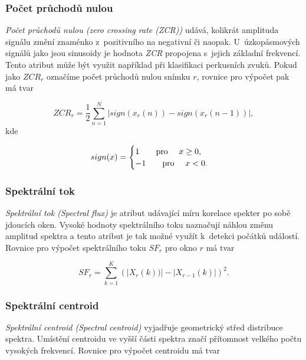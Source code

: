 \subsubsection*{Počet průchodů nulou}
\textit{Počet průchodů nulou (zero crossing rate (ZCR))} udává, kolikrát amplituda signálu změní znaménko z~pozitivního na negativní či naopak. U~úzkopásmových signálů jako jsou sinusoidy je hodnota \textit{ZCR} propojena s~jejich základní frekvencí. Tento atribut může být využit například při klasifikaci perkusních zvuků. Pokud jako $ZCR_r$ označíme počet průchodů nulou snímku $r$, rovnice pro výpočet pak má tvar

\begin{equation}
	ZCR_r = \frac{1}{2} \sum\limits_{n=1}^{N} | sign(x_r(n)) - sign(x_r(n-1)) |,
\end{equation}
kde

\begin{equation}
    sign(x)=
    \begin{cases}
        1 \text{\qquad pro \quad} x \geq 0,\\
        -1 \text{\qquad pro \quad} x < 0.\\
    \end{cases}
\end{equation}
\cite{MIR}\cite{zcr}\cite{low_level}\cite{mircom}\cite{aca}

\subsubsection*{Spektrální tok}
\textit{Spektrální tok (Spectral flux)} je atribut udávající míru korelace spekter po sobě jdoucích oken. Vysoké hodnoty spektrálního toku naznačují náhlou změnu amplitud spektra a tento atribut je tak možné využít k~detekci počátků událostí. Rovnice pro výpočet spektrálního toku $SF_r$ pro okno $r$ má tvar

\begin{equation}
	SF_r = \sum\limits_{k=1}^{K} {(|X_r(k))| - |X_{r-1}(k)|)}^2.
\end{equation}
\cite{low_level}\cite{mgc}\cite{aca}

\subsubsection*{Spektrální centroid}
\textit{Spektrální centroid (Spectral centroid)} vyjadřuje geometrický střed distribuce spektra. Umístění centroidu ve vyšší části spektra značí přítomnost velkého počtu vysokých frekvencí. Rovnice pro výpočet centroidu má tvar

